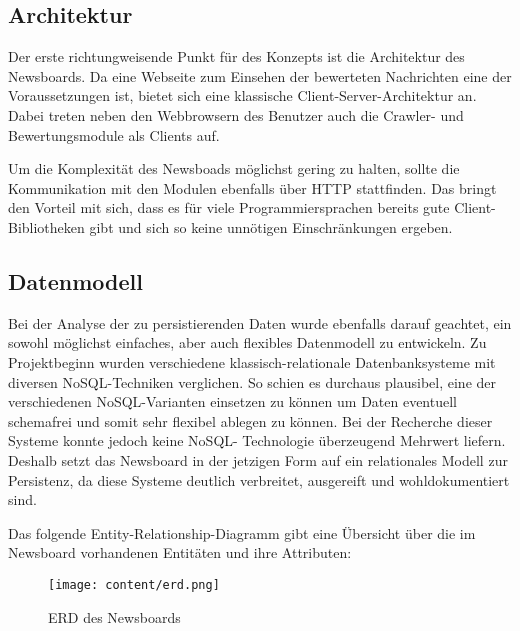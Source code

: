 \subsection{Architektur}
Der erste richtungweisende Punkt für des Konzepts ist die Architektur des Newsboards.
Da eine Webseite zum Einsehen der bewerteten Nachrichten eine der Voraussetzungen ist,
bietet sich eine klassische Client-Server-Architektur an.
Dabei treten neben den Webbrowsern des Benutzer auch die Crawler-
und Bewertungsmodule als Clients auf.

Um die Komplexität des Newsboads möglichst gering zu halten, sollte die Kommunikation
mit den Modulen ebenfalls über HTTP stattfinden. Das bringt den Vorteil mit sich,
dass es für viele Programmiersprachen bereits gute Client-Bibliotheken gibt
und sich so keine unnötigen Einschränkungen ergeben.

\subsection{Datenmodell}
Bei der Analyse der zu persistierenden Daten wurde ebenfalls darauf geachtet, ein
sowohl möglichst einfaches, aber auch flexibles Datenmodell zu entwickeln. Zu Projektbeginn wurden verschiedene klassisch-relationale Datenbanksysteme mit diversen 
NoSQL-Techniken verglichen. So schien es durchaus plausibel, eine der verschiedenen
NoSQL-Varianten einsetzen zu können um Daten eventuell schemafrei und somit sehr flexibel 
ablegen zu können. Bei der Recherche dieser Systeme konnte jedoch keine NoSQL-
Technologie überzeugend Mehrwert liefern. Deshalb setzt das Newsboard in der jetzigen Form 
auf ein relationales Modell zur Persistenz, da diese Systeme deutlich 
verbreitet, ausgereift und wohldokumentiert sind.

Das folgende Entity-Relationship-Diagramm gibt eine Übersicht über die im Newsboard
vorhandenen Entitäten und ihre Attributen:

\begin{figure}[h]
	\centering 
	\texttt{[image: content/erd.png]}
	\label{erd}
	\caption{ERD des Newsboards}
\end{figure}

